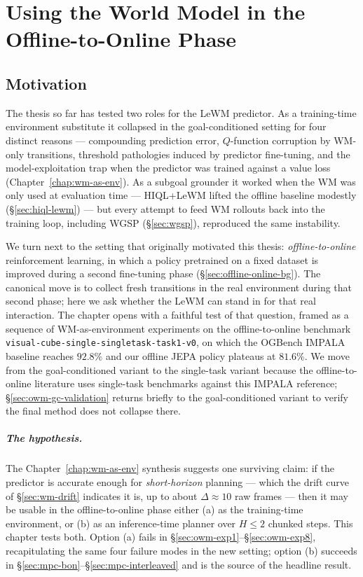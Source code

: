 \chapter{Using the World Model in the Offline-to-Online Phase}
\label{chap:online-with-wm}

\section{Motivation}
\label{sec:owm-motivation}

The thesis so far has tested two roles for the LeWM predictor. As a
training-time environment substitute it collapsed in the goal-conditioned
setting for four distinct reasons --- compounding prediction error,
$Q$-function corruption by WM-only transitions, threshold pathologies
induced by predictor fine-tuning, and the model-exploitation trap when
the predictor was trained against a value loss
(Chapter~\ref{chap:wm-as-env}). As a subgoal grounder it worked when the
WM was only used at evaluation time --- HIQL+LeWM lifted the offline
baseline modestly (\S\ref{sec:hiql-lewm}) --- but every attempt to feed
WM rollouts back into the training loop, including WGSP
(\S\ref{sec:wgsp}), reproduced the same instability.

We turn next to the setting that originally motivated this thesis:
\emph{offline-to-online} reinforcement learning, in which a policy
pretrained on a fixed dataset is improved during a second
fine-tuning phase
(\S\ref{sec:offline-online-bg}). The canonical move is to collect fresh
transitions in the real environment during that second phase; here we
ask whether the LeWM can stand in for that real interaction. The chapter
opens with a faithful test of that question, framed as a sequence of
WM-as-environment experiments on the offline-to-online benchmark
\texttt{visual-cube-single-singletask-task1-v0}, on which the OGBench
IMPALA baseline reaches $92.8\%$ \cite{espeholt2018impala, ogbench_park2025}
and our offline JEPA policy plateaus at $81.6\%$. We move from the
goal-conditioned variant to the single-task variant because the
offline-to-online literature uses single-task benchmarks against this
IMPALA reference; \S\ref{sec:owm-gc-validation} returns briefly to the
goal-conditioned variant to verify the final method does not collapse
there.

\paragraph{The hypothesis.}
The Chapter~\ref{chap:wm-as-env} synthesis suggests one surviving claim:
if the predictor is accurate enough for \emph{short-horizon} planning ---
which the drift curve of \S\ref{sec:wm-drift} indicates it is, up to
about $\Delta\approx 10$ raw frames --- then it may be usable in the
offline-to-online phase either (a) as the training-time environment, or
(b) as an inference-time planner over $H\le 2$ chunked steps. This
chapter tests both. Option (a) fails in §\ref{sec:owm-exp1}--§\ref{sec:owm-exp8},
recapitulating the same four failure modes in the new setting; option
(b) succeeds in §\ref{sec:mpc-bon}--§\ref{sec:mpc-interleaved} and is
the source of the headline result.

